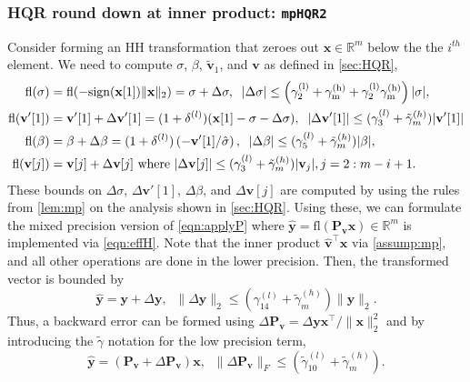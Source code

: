 \documentclass[review,onefignum,onetabnum]{siamart190516}
\newcommand{\R}{\mathbb{R}}
\newcommand{\dd}{\delta}
\newcommand{\bb}[1]{\mathbf{#1}}
\newcommand{\fl}{\mathrm{fl}}
\begin{document}
\subsubsection{HQR round down at inner product: {\tt mpHQR2}}
Consider forming an HH transformation that zeroes out $\bb{x}\in\R^m$ below the the $i^{th}$ element. 
We need to compute $\sigma$, $\beta$, $\tilde{\bb{v}}_1$, and $\bb{v}$ as defined in \cref{sec:HQR},
\begin{align}
\fl(\sigma) &= \fl(-\rm{sign}(\bb{x}[1])\|\bb{x}\|_2) = \sigma + \Delta \sigma,\;\;|\Delta\sigma| \leq \left(\gamma_{2}^{(l)}+\gamma_{m}^{(h)}+\gamma_{2}^{(l)}\gamma_{m}^{(h)}\right)|\sigma|,\label{eqn:mpsigma}\\
\fl(\bb{v}'[1])& =\bb{v}'[1] + \Delta \bb{v}'[1] = (1+\dd^{(l)}) (\bb{x}[1]-\sigma-\Delta\sigma), \;\;|\Delta\bb{v}'[1]| \leq (\gamma_{3}^{(l)}+\tilde{\gamma}_{m}^{(h)})|\bb{v}'[1]| \label{eqn:mpv1}\\
\fl(\beta) &= \beta +\Delta \beta= (1+\dd^{(l)})\left(-\bb{v}'[1]/\hat{\sigma}\right), \;\; |\Delta\beta| \leq (\gamma_{5}^{(l)}+\tilde{\gamma}_{m}^{(h)})|\beta|, \label{eqn:mpbeta}\\
\fl(\bb{v}[j])	&= \bb{v}[j] + \Delta \bb{v}[j]\text{ where }|\Delta \bb{v}[j]|\leq 
(\gamma_{3}^{(l)} + \tilde{\gamma}_{m}^{(h)})|\bb{v}_j|,j=2:m-i+1 \label{eqn:mpv}. 
\end{align}
These bounds on $\Delta\sigma$, $\Delta \bb{v}'[1]$, $\Delta \beta$, and $\Delta \bb{v}[j]$ are computed by using the rules from \cref{lem:mp} on the analysis shown in \cref{sec:HQR}.
Using these, we can formulate the mixed precision version of \cref{eqn:applyP} where $\hat{\bb{y}}=\fl(\bb{P_vx})\in\R^m$ is implemented via \cref{eqn:effH}.
Note that the inner product $\hat{\bb{v}}^{\top}\bb{x}$ via \cref{assump:mp}, and all other operations are done in the lower precision.
Then, the transformed vector is bounded by
\begin{equation}
\hat{\bb{y}} = \bb{y}+\Delta \bb{y},\;\; \|\Delta \bb{y}\|_2 \leq (\gamma_{14}^{(l)} + \tilde{\gamma}_{m}^{(h)})\|\bb{y}\|_2.\label{eqn:mpdelty}
\end{equation}
Thus, a backward error can be formed using $\Delta \bb{P_v} = \Delta \bb{y}\bb{x}^{
	\top}/\|\bb{x}\|_2^2$ and by introducing the $\tilde{\gamma}$ notation for the low precision term,
\begin{equation}
\hat{\bb{y}} = (\bb{P_v} + \Delta \bb{P_v})\bb{x},\;\; \|\Delta \bb{P_v}\|_F\leq (\tilde{\gamma}_{10}^{(l)} + \tilde{\gamma}_{m}^{(h)}).\label{eqn:mpapplyP}
\end{equation}
\end{document}
